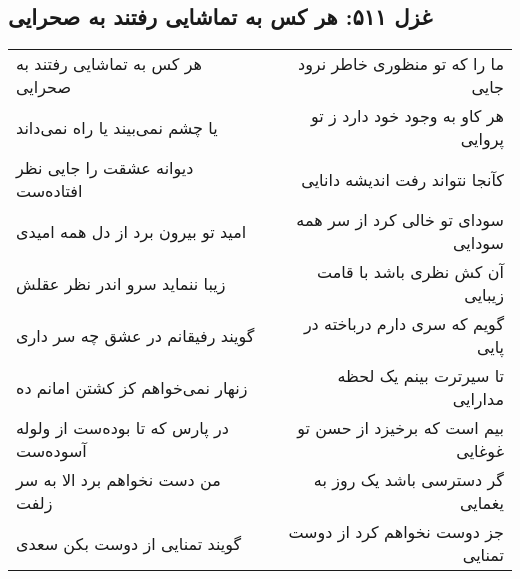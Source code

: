 \begin{center}
\section*{غزل ۵۱۱: هر کس به تماشایی رفتند به صحرایی}
\label{sec:511}
\begin{longtable}{l p{0.5cm} r}
هر کس به تماشایی رفتند به صحرایی
&&
ما را که تو منظوری خاطر نرود جایی
\\
یا چشم نمی‌بیند یا راه نمی‌داند
&&
هر کاو به وجود خود دارد ز تو پروایی
\\
دیوانه عشقت را جایی نظر افتاده‌ست
&&
کآنجا نتواند رفت اندیشه دانایی
\\
امید تو بیرون برد از دل همه امیدی
&&
سودای تو خالی کرد از سر همه سودایی
\\
زیبا ننماید سرو اندر نظر عقلش
&&
آن کش نظری باشد با قامت زیبایی
\\
گویند رفیقانم در عشق چه سر داری
&&
گویم که سری دارم درباخته در پایی
\\
زنهار نمی‌خواهم کز کشتن امانم ده
&&
تا سیرترت بینم یک لحظه مدارایی
\\
در پارس که تا بوده‌ست از ولوله آسوده‌ست
&&
بیم است که برخیزد از حسن تو غوغایی
\\
من دست نخواهم برد الا به سر زلفت
&&
گر دسترسی باشد یک روز به یغمایی
\\
گویند تمنایی از دوست بکن سعدی
&&
جز دوست نخواهم کرد از دوست تمنایی
\\
\end{longtable}
\end{center}
